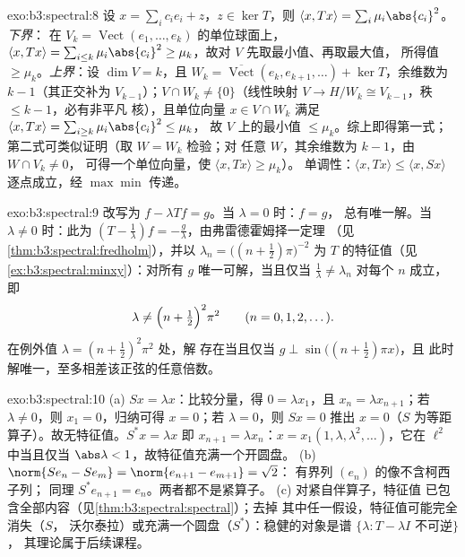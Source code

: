 \begin{solution}{exo:b3:spectral:8}
设 $x = \sum_ic_ie_i + z$，$z \in \ker T$，则 $\langle x,
Tx\rangle = \sum_i\mu_i\abs{c_i}^2$。\emph{下界}：
在 $V_k = \operatorname{Vect}(e_1, \dots,
e_k)$ 的单位球面上，$\langle x, Tx\rangle = \sum_{i\leq
k}\mu_i\abs{c_i}^2 \geq \mu_k$，故对 $V$ 先取最小值、再取最大值，
所得值 $\geq \mu_k$。\emph{上界}：设 $\dim V = k$，且 $W_k
= \overline{\operatorname{Vect}}(e_k, e_{k+1}, \dots) +
\ker T$，余维数为 $k - 1$（其正交补为
$V_{k-1}$）；$V \cap W_k \neq \{0\}$（线性映射 $V \to
H/W_k \cong V_{k-1}$，秩 $\leq k - 1$，必有非平凡
核），且单位向量 $x \in V\cap W_k$ 满足 $\langle x,
Tx\rangle = \sum_{i \geq k}\mu_i\abs{c_i}^2 \leq \mu_k$，
故 $V$ 上的最小值 $\leq \mu_k$。综上即得第一式；
第二式可类似证明（取 $W = W_k$ 检验；对
任意 $W$，其余维数为 $k-1$，由 $W \cap V_k \neq 0$，
可得一个单位向量，使 $\langle x, Tx\rangle \geq \mu_k$）。
单调性：$\langle x, Tx\rangle \leq \langle x,
Sx\rangle$ 逐点成立，经 $\max\min$ 传递。
\end{solution}

\begin{solution}{exo:b3:spectral:9}
改写为 $f - \lambda Tf = g$。当 $\lambda = 0$ 时：$f = g$，
总有唯一解。当 $\lambda \neq 0$ 时：此为
$(T - \frac1\lambda)f = -\frac g\lambda$，由弗雷德霍姆择一定理
（见\cref{thm:b3:spectral:fredholm}），并以
$\lambda_n = \bigl((n + \frac12)\pi\bigr)^{-2}$ 为
$T$ 的特征值（见\cref{ex:b3:spectral:minxy}）：对所有 $g$ 唯一可解，当且仅当
$\frac1\lambda \neq \lambda_n$ 对每个 $n$ 成立，即
\[
\lambda \neq \Bigl(n + \tfrac12\Bigr)^2\pi^2
\qquad (n = 0, 1, 2, \dots).
\]
在例外值 $\lambda = (n+\frac12)^2\pi^2$ 处，解
存在当且仅当 $g \perp \sin\bigl((n{+}\frac12)\pi x\bigr)$，且
此时解唯一，至多相差该正弦的任意倍数。
\end{solution}

\begin{solution}{exo:b3:spectral:10}
(a) $Sx = \lambda x$：比较分量，得 $0 = \lambda
x_1$，且 $x_n = \lambda x_{n+1}$；若 $\lambda \ne 0$，则
$x_1 = 0$，归纳可得 $x = 0$；若 $\lambda = 0$，则 $Sx = 0$
推出 $x = 0$（$S$ 为等距算子）。故无特征值。$S^*x =
\lambda x$ 即 $x_{n+1} = \lambda x_n$：$x =
x_1(1, \lambda, \lambda^2, \dots)$，它在 $\ell^2$ 中当且仅当
$\abs\lambda < 1$，故特征值充满一个开圆盘。
(b) $\norm{Se_n - Se_m} = \norm{e_{n+1} - e_{m+1}} = \sqrt2$：
有界列 $(e_n)$ 的像不含柯西子列；
同理 $S^*e_{n+1} = e_n$。两者都不是紧算子。
(c) 对紧自伴算子，特征值
已包含全部内容（见\cref{thm:b3:spectral:spectral}）；去掉
其中任一假设，特征值可能完全消失（$S$，
沃尔泰拉）或充满一个圆盘（$S^*$）：稳健的对象是谱
$\{\lambda : T - \lambda I \text{ 不可逆}\}$，
其理论属于后续课程。
\end{solution}

